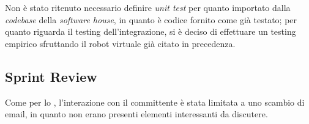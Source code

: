 Non è stato ritenuto necessario definire \textit{unit test} per quanto importato dalla \textit{codebase} della \textit{software house}, in quanto è codice fornito come già testato;
per quanto riguarda il testing dell'integrazione, si è deciso di effettuare un testing empirico sfruttando il robot virtuale già citato in precedenza.

\subsection{Sprint Review}

Come per lo , l'interazione con il committente è stata limitata a uno scambio di email, in quanto non erano presenti elementi interessanti da discutere.
